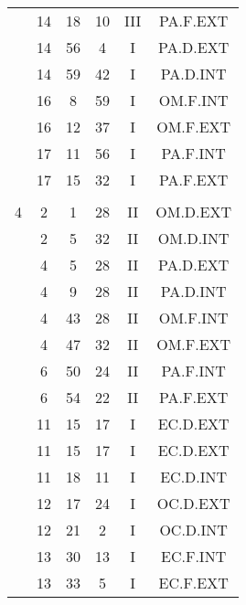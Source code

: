 \documentclass[12pt, a4paper]{article}
\begin{document}
\begin{multicols}{3}
{\begin{tabular}{c c c c c c}
	 	 	 	 & 14 & 18 & 10 & III & PA.F.EXT\\%
	 	 	 	 & 14 & 56 & 4 & I & PA.D.EXT\\%
	 	 	 	 & 14 & 59 & 42 & I & PA.D.INT\\%
	 	 	 	 & 16 & 8 & 59 & I & OM.F.INT\\%
	 	 	 	 & 16 & 12 & 37 & I & OM.F.EXT\\%
	 	 	 	 & 17 & 11 & 56 & I & PA.F.INT\\%
	 	 	 	 & 17 & 15 & 32 & I & PA.F.EXT\\%
	 	 	 	 & & & & & \\%
	 	 	 	4 & 2 & 1 & 28 & II & OM.D.EXT\\%
	 	 	 	 & 2 & 5 & 32 & II & OM.D.INT\\%
	 	 	 	 & 4 & 5 & 28 & II & PA.D.EXT\\%
	 	 	 	 & 4 & 9 & 28 & II & PA.D.INT\\%
	 	 	 	 & 4 & 43 & 28 & II & OM.F.INT\\%
	 	 	 	 & 4 & 47 & 32 & II & OM.F.EXT\\%
	 	 	 	 & 6 & 50 & 24 & II & PA.F.INT\\%
	 	 	 	 & 6 & 54 & 22 & II & PA.F.EXT\\%
	 	 	 	 & 11 & 15 & 17 & I & EC.D.EXT\\%
	 	 	 	 & 11 & 15 & 17 & I & EC.D.EXT\\%
	 	 	 	 & 11 & 18 & 11 & I & EC.D.INT\\%
	 	 	 	 & 12 & 17 & 24 & I & OC.D.EXT\\%
	 	 	 	 & 12 & 21 & 2 & I & OC.D.INT\\%
	 	 	 	 & 13 & 30 & 13 & I & EC.F.INT\\%
	 	 	 	 & 13 & 33 & 5 & I & EC.F.EXT\\%

\end{tabular}}
\end{multicols}
\end{document}
